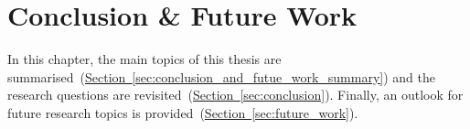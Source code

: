 \chapter{Conclusion \& Future Work}\label{chap:conclusion_and_futue_work}
In this chapter, the main topics of this thesis are summarised~(\hyperref[sec:conclusion_and_futue_work_summary]{Section~\ref*{sec:conclusion_and_futue_work_summary}}) and the research questions are revisited~(\hyperref[sec:conclusion]{Section~\ref*{sec:conclusion}}). Finally, an outlook for future research topics is provided~(\hyperref[sec:future_work]{Section~\ref*{sec:future_work}}).








